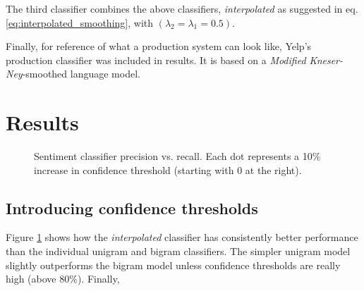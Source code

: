 \documentclass[a4paper,11pt]{kth-mag}
\newcommand{\ysc}{Modified Kneser-Ney classifier}
\begin{document}
The third classifier combines the above classifiers, \emph{interpolated} as suggested in eq. \ref{eq:interpolated_smoothing}, with
$(\lambda_2=\lambda_1=0.5)$.

Finally, for reference of what a production system can look like, Yelp's production classifier was included in results. It is based on a \emph{Modified Kneser-Ney}-smoothed language model.


\newpage
\section{Results}


\begin{figure}[h]
  \centering
  \caption{Sentiment classifier precision vs. recall. Each dot represents a 10\% increase in confidence threshold (starting with 0 at the right).}
  \label{fig:sent_pr_curve}
\end{figure}

\subsection{Introducing confidence thresholds}
Figure \ref{fig:sent_pr_curve} shows how the \emph{interpolated} classifier has consistently better performance than the individual unigram and bigram classifiers. The simpler unigram model slightly outperforms the bigram model unless confidence thresholds are really high (above 80\%). Finally,

\newpage
\end{document}
